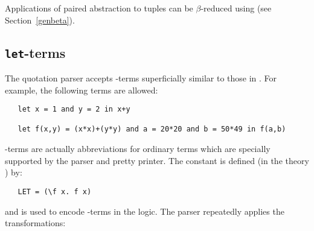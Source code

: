 {Applications of paired abstraction to tuples can be $\beta$-reduced using
 (see Section~\ref{genbeta}).


\subsection{{\tt let}-terms}
\label{let-exp}


The quotation parser
 accepts -terms superficially similar to those in
\ML. For example, the following terms are allowed:

\begin{hol}\begin{verbatim}
   let x = 1 and y = 2 in x+y

   let f(x,y) = (x*x)+(y*y) and a = 20*20 and b = 50*49 in f(a,b)
\end{verbatim}\end{hol}

-terms are actually abbreviations for ordinary  terms which are
specially supported by the parser and pretty printer.
The constant  is defined (in the theory ) by:

\begin{hol}
\begin{verbatim}
   LET = (\f x. f x)
\end{verbatim}\end{hol}

\noindent and is used to encode -terms in the logic. The parser
repeatedly applies the transformations:

\bigskip

\noindent
{\small{}}

}
